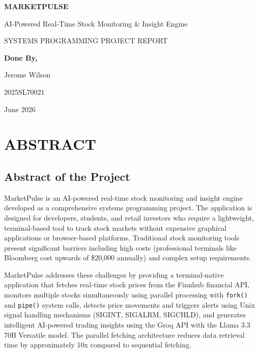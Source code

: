 \documentclass[12pt,a4paper]{article}
\begin{document}
\begin{titlepage}
    \centering
    \vspace*{3cm}
    
    {\Huge\bfseries MARKETPULSE\par}
    \vspace{1cm}
    {\Large AI-Powered Real-Time Stock Monitoring \& Insight Engine\par}
    \vspace{2cm}
    {\large SYSTEMS PROGRAMMING PROJECT REPORT\par}
    \vspace{4cm}
    {\large\bfseries Done By,\par}
    \vspace{0.5cm}
    {\Large Jerome Wilson\par}
    \vspace{0.3cm}
    {\large 2025SL70021\par}
    \vspace{2cm}
    {\large June 2026\par}
    
    \vfill
\end{titlepage}

\tableofcontents
\newpage

\section{ABSTRACT}

\subsection{Abstract of the Project}

MarketPulse is an AI-powered real-time stock monitoring and insight engine developed as a comprehensive systems programming project. The application is designed for developers, students, and retail investors who require a lightweight, terminal-based tool to track stock markets without expensive graphical applications or browser-based platforms. Traditional stock monitoring tools present significant barriers including high costs (professional terminals like Bloomberg cost upwards of \$20,000 annually) and complex setup requirements.

MarketPulse addresses these challenges by providing a terminal-native application that fetches real-time stock prices from the Finnhub financial API, monitors multiple stocks simultaneously using parallel processing with \texttt{fork()} and \texttt{pipe()} system calls, detects price movements and triggers alerts using Unix signal handling mechanisms (SIGINT, SIGALRM, SIGCHLD), and generates intelligent AI-powered trading insights using the Groq API with the Llama 3.3 70B Versatile model. The parallel fetching architecture reduces data retrieval time by approximately 10x compared to sequential fetching.
\end{document}
